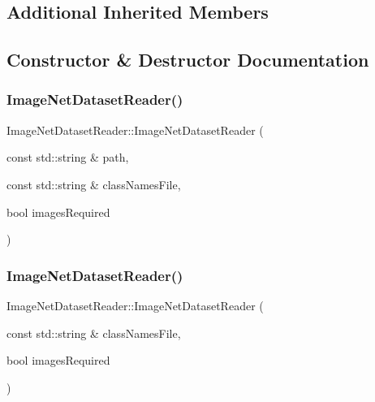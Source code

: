 \subsection*{Additional Inherited Members}


\subsection{Constructor \& Destructor Documentation}
\mbox{\label{class_image_net_dataset_reader_aca1e379e9959ec441fc9f3cf51ae5af1}} 
\subsubsection{\texorpdfstring{Image\+Net\+Dataset\+Reader()}{ImageNetDatasetReader()}\hspace{0.1cm}{\footnotesize\ttfamily [1/2]}}
{\footnotesize\ttfamily Image\+Net\+Dataset\+Reader\+::\+Image\+Net\+Dataset\+Reader (\begin{DoxyParamCaption}\item[{const std\+::string \&}]{path,  }\item[{const std\+::string \&}]{class\+Names\+File,  }\item[{bool}]{images\+Required }\end{DoxyParamCaption})}

\mbox{\label{class_image_net_dataset_reader_a451f7a4c7a11966e2539a0a51d7cd089}} 
\subsubsection{\texorpdfstring{Image\+Net\+Dataset\+Reader()}{ImageNetDatasetReader()}\hspace{0.1cm}{\footnotesize\ttfamily [2/2]}}
{\footnotesize\ttfamily Image\+Net\+Dataset\+Reader\+::\+Image\+Net\+Dataset\+Reader (\begin{DoxyParamCaption}\item[{const std\+::string \&}]{class\+Names\+File,  }\item[{bool}]{images\+Required }\end{DoxyParamCaption})}




